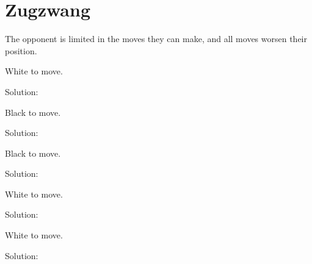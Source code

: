 \documentclass{book}
\begin{document}
\section{Zugzwang}
The opponent is limited in the moves they can make, and all moves worsen their position.\begin{multicols}{2} 
\begin{samepage} 
\newgame 


 
\showboard
 
 White to move. 
 
Solution: 
 
\end{samepage}\begin{samepage} 
\newgame 


 
\showboard
 
 Black to move. 
 
Solution: 
 
\end{samepage}\begin{samepage} 
\newgame 


 
\showboard
 
 Black to move. 
 
Solution: 
 
\end{samepage}\begin{samepage} 
\newgame 


 
\showboard
 
 White to move. 
 
Solution: 
 
\end{samepage}\begin{samepage} 
\newgame 


 
\showboard
 
 White to move. 
 
Solution: 
 
\end{samepage}\end{multicols} 
\end{document}

